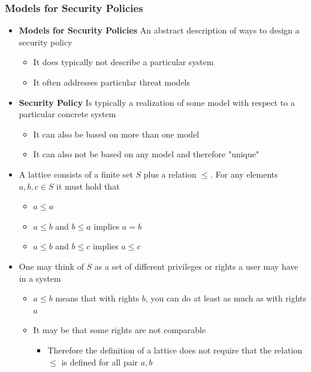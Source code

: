 \documentclass[11pt]{article}
\begin{document}
\subsubsection{Models for Security Policies}
\label{sec:org2e2f51b}
\begin{itemize}
\item \textbf{Models for Security Policies} An abstract description of ways to design a security policy
\begin{itemize}
\item It does typically not describe a particular system
\item It often addresses particular threat models
\end{itemize}

\item \textbf{Security Policy} Is typically a realization of some model with respect to a particular concrete system
\begin{itemize}
\item It can also be based on more than one model
\item It can also not be based on any model and therefore "unique"
\end{itemize}

\item A lattice consists of a finite set \(S\) plus a relation \(\leq\). For any elements \(a,b,c \in S\) it must hold that 
\begin{itemize}
\item \(a \leq a\)
\item \(a \leq b\) and \(b \leq a\) implies \(a = b\)
\item \(a \leq b\) and \(b \leq c\) implies \(a \leq c\)
\end{itemize}

\item One may think of \(S\) as a set of different privileges or rights a user may have in a system
\begin{itemize}
\item \(a \leq b\) means that with rights \(b\), you can do at least as much as with rights \(a\)
\item It may be that some rights are not comparable
\begin{itemize}
\item Therefore the definition of a lattice does not require that the relation \(\leq\) is defined for all pair \(a,b\)
\end{itemize}
\end{itemize}


\end{itemize}
\end{document}
